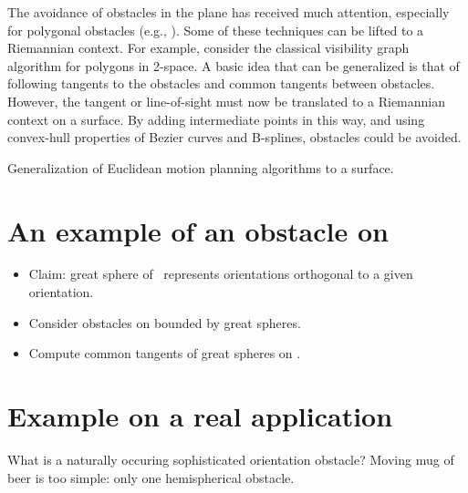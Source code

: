 The avoidance of obstacles in the plane has received much attention,
especially for polygonal obstacles (e.g., \cite{lozano79,hersh88,ghosh91}).
Some of these techniques can be lifted to a Riemannian context.
For example, consider the classical visibility graph algorithm for polygons
in 2-space.
A basic idea that can be generalized is that of following tangents
to the obstacles and common tangents between obstacles.
However, the tangent or line-of-sight must now be translated to a Riemannian 
context on a surface.
By adding intermediate points in this way, and using convex-hull
properties of Bezier curves and B-splines, obstacles could be avoided.

Generalization of Euclidean motion planning algorithms to a surface.

\section{An example of an obstacle on }

\begin{itemize}
\item
Claim: great sphere of \ represents orientations orthogonal to a given
	orientation.
\item	
Consider obstacles on  bounded by great spheres.
\item
Compute common tangents of great spheres on .\
\end{itemize}

\section{Example on a real application}

What is a naturally occuring sophisticated orientation obstacle?
Moving mug of beer is too simple: only one hemispherical obstacle.


